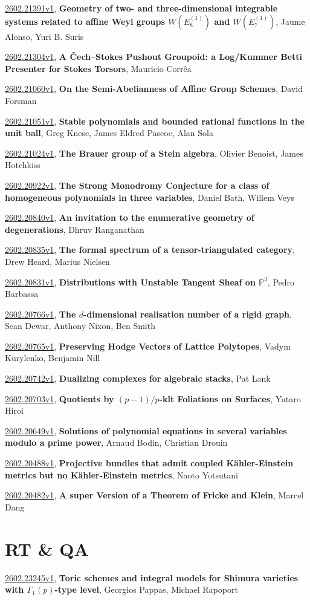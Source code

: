 \documentclass[9pt, a4paper]{article}
\theoremstyle{plain}
\theoremstyle{definition}
\theoremstyle{remark}
\newcommand{\arxiv}[3]{\href{https://arxiv.org/abs/#1}{#1}, \textbf{\textcolor{arxivblue}{#2}}, #3}
\begin{document}
\arxiv{2602.21391v1}{Geometry of two- and three-dimensional integrable systems related to affine Weyl groups $W(E_8^{(1)})$ and $W(E_7^{(1)})$}{Jaume Alonso, Yuri B. Suris}

\arxiv{2602.21304v1}{A Čech--Stokes Pushout Groupoid: a Log/Kummer Betti Presenter for Stokes Torsors}{Mauricio Corrêa}

\arxiv{2602.21060v1}{On the Semi-Abelianness of Affine Group Schemes}{David Forsman}

\arxiv{2602.21051v1}{Stable polynomials and bounded rational functions in the unit ball}{Greg Knese, James Eldred Pascoe, Alan Sola}

\arxiv{2602.21024v1}{The Brauer group of a Stein algebra}{Olivier Benoist, James Hotchkiss}

\arxiv{2602.20922v1}{The Strong Monodromy Conjecture for a class of homogeneous polynomials in three variables}{Daniel Bath, Willem Veys}

\arxiv{2602.20840v1}{An invitation to the enumerative geometry of degenerations}{Dhruv Ranganathan}

\arxiv{2602.20835v1}{The formal spectrum of a tensor-triangulated category}{Drew Heard, Marius Nielsen}

\arxiv{2602.20831v1}{Distributions with Unstable Tangent Sheaf on $\mathbb{P}^3$}{Pedro Barbassa}

\arxiv{2602.20766v1}{The $d$-dimensional realisation number of a rigid graph}{Sean Dewar, Anthony Nixon, Ben Smith}

\arxiv{2602.20765v1}{Preserving Hodge Vectors of Lattice Polytopes}{Vadym Kurylenko, Benjamin Nill}

\arxiv{2602.20742v1}{Dualizing complexes for algebraic stacks}{Pat Lank}

\arxiv{2602.20703v1}{Quotients by $(p-1)/p$-klt Foliations on Surfaces}{Yutaro Hiroi}

\arxiv{2602.20649v1}{Solutions of polynomial equations in several variables modulo a prime power}{Arnaud Bodin, Christian Drouin}

\arxiv{2602.20488v1}{Projective bundles that admit coupled Kähler-Einstein metrics but no Kähler-Einstein metrics}{Naoto Yotsutani}

\arxiv{2602.20482v1}{A super Version of a Theorem of Fricke and Klein}{Marcel Dang}


\section{RT \& QA}
\arxiv{2602.23245v1}{Toric schemes and integral models for Shimura varieties with $Γ_1(p)$-type level}{Georgios Pappas, Michael Rapoport}
\end{document}
